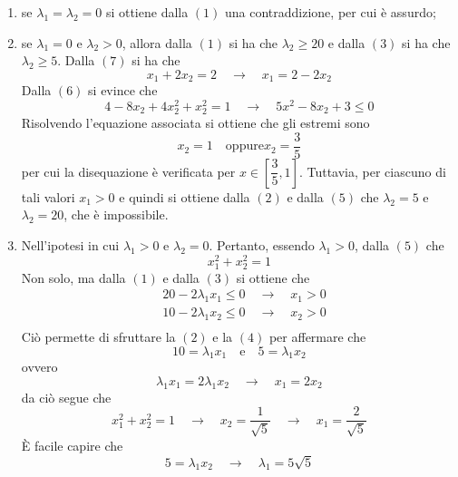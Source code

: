 \documentclass[a4paper]{extarticle}
\begin{document}
\begin{enumerate}
    \item se $\lambda_1=\lambda_2=0$ si ottiene dalla $(1)$ una contraddizione, per cui è assurdo;
    \item se $\lambda_1=0$ e $\lambda_2>0$, allora dalla $(1)$ si ha che $\lambda_2 \geq 20$ e dalla $(3)$ si ha che $\lambda_2 \geq 5$. Dalla $(7)$ si ha che
    \[x_1+2x_2=2 \hspace{1em} \rightarrow \hspace{1em} x_1=2-2x_2\]
    Dalla $(6)$ si evince che 
    \[4-8x_2+4x_2^2+x_2^2=1 \hspace{1em} \rightarrow \hspace{1em} 5x^2-8x_2+3 \leq 0\]
    Risolvendo l'equazione associata si ottiene che gli estremi sono
    \[x_2=1 \hspace{1em} \text{oppure} x_2=\dfrac{3}{5}\]
    per cui la disequazione è verificata per $x \in \left[\dfrac{3}{5},1\right]$. Tuttavia, per ciascuno di tali valori $x_1 > 0$ e quindi si ottiene dalla $(2)$ e dalla $(5)$ che $\lambda_2=5$ e $\lambda_2=20$, che è impossibile.
    \item Nell'ipotesi in cui $\lambda_1>0$ e $\lambda_2=0$. Pertanto, essendo $\lambda_1>0$, dalla $(5)$ che
    \[x_1^2+x_2^2=1\]
    Non solo, ma dalla $(1)$ e dalla $(3)$ si ottiene che
    \begin{align*}
      & 20-2\lambda_1 x_1 \leq 0 \hspace{1em} \rightarrow \hspace{1em} x_1 > 0\\
      & 10-2\lambda_1 x_2 \leq 0 \hspace{1em} \rightarrow \hspace{1em} x_2 > 0\\
    \end{align*}
    Ciò permette di sfruttare la $(2)$ e la $(4)$ per affermare che
    \[10 = \lambda_1 x_1 \hspace{1em} \text{e} \hspace{1em} 5=\lambda_1 x_2\]
    ovvero
    \[\lambda_1 x_1 = 2 \lambda_1 x_2 \hspace{1em} \rightarrow \hspace{1em} x_1=2x_2\]
    da ciò segue che
    \[x_1^2+x_2^2 = 1 \hspace{1em} \rightarrow \hspace{1em} x_2 = \dfrac{1}{\sqrt{5}}\hspace{1em} \rightarrow \hspace{1em} x_1=\dfrac{2}{\sqrt{5}}\]
    È facile capire che
    \[5=\lambda_1 x_2 \hspace{1em} \rightarrow \hspace{1em} \lambda_1=5 \sqrt{5}\]
\end{enumerate}
\end{document}
